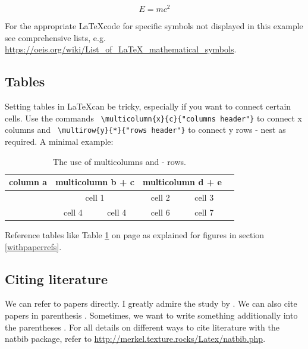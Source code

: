 \begin{equation}
E = mc^2
\end{equation}

For the appropriate \LaTeX code for specific symbols not displayed in this example see comprehensive lists, e.g. \url{https://oeis.org/wiki/List_of_LaTeX_mathematical_symbols}.

\subsection{Tables}

Setting tables in \LaTeX can be tricky, especially if you want to connect certain cells. Use the commands \verb+ \multicolumn{x}{c}{"columns header"}+ to connect x columns and \verb+ \multirow{y}{*}{"rows header"}+ to connect y rows - nest as required. A minimal example:

\begin{table}[h!]
    \centering
    \caption{The use of multicolumns and - rows.}
    \label{ex_table}
    \begin{tabular}{@{}l*{5}{c}@{}} 
    \toprule
    column a & \multicolumn{2}{c}{multicolumn b + c} & \multicolumn{2}{c}{multicolumn d + e}\\
    \midrule
    \addlinespace
    \multirow{2}{*}{multirow 1 + 2 }
    & \multicolumn{2}{c}{cell 1} & {cell 2} & {cell 3}\\ 
    & {cell 4} & {cell 4} & {cell 6} & {cell 7}\\ 
    \bottomrule
    \end{tabular}
\end{table}


Reference tables like Table \ref{ex_table} on page \pageref{ex_table} as explained for figures in section \ref{withpaperrefs}.


\subsection{Citing literature}

We can refer to papers directly. I greatly admire the study by \cite{ADRIAN1934}. We can also cite papers in parenthesis \citep{ADRIAN1934}. Sometimes, we want to write something additionally into the parentheses \citep[the study by][is also not bad]{Allard2011}. For all details on different ways to cite literature with the natbib package, refer to \url{http://merkel.texture.rocks/Latex/natbib.php}. 

